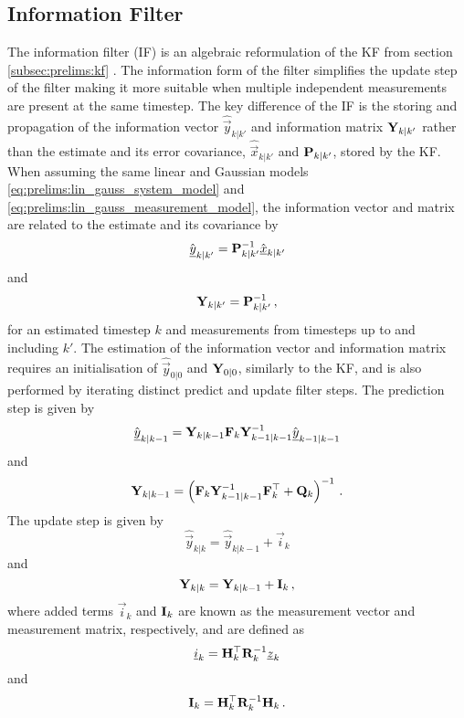 \subsection{Information Filter}\label{subsec:prelims:if}
The information filter (IF) is an algebraic reformulation of the KF from section \ref{subsec:prelims:kf} \cite{simonOptimalStateEstimation2006,mutambaraDecentralizedEstimationControl1998}. The information form of the filter simplifies the update step of the filter making it more suitable when multiple independent measurements are present at the same timestep. The key difference of the IF is the storing and propagation of the information vector $\hat{\vec{y}}_{k|k'}$ and information matrix ${{\mathbf{Y}}}_{k|k'}$ rather than the estimate and its error covariance, $\hat{\vec{x}}_{k|k'}$ and ${{\mathbf{P}}}_{k|k'}$, stored by the KF. When assuming the same linear and Gaussian models \eqref{eq:prelims:lin_gauss_system_model} and \eqref{eq:prelims:lin_gauss_measurement_model}, the information vector and matrix are related to the estimate and its covariance by
\begin{equation}\label{eq:prelims:info_vec_defn}
    \hat{{\underline{y}}}_{k|k'} = {{\mathbf{P}}}_{k|k'}^{-1}\hat{{\underline{x}}}_{k|k'}
\end{equation}
and
\begin{equation}\label{eq:prelims:info_mat_defn}
    {\ensuremath{{\mathbf{Y}}}}_{k|k'} = {{\mathbf{P}}}_{k|k'}^{-1}\,,
\end{equation}
for an estimated timestep $k$ and measurements from timesteps up to and including $k'$. The estimation of the information vector and information matrix requires an initialisation of $\hat{\vec{y}}_{0|0}$ and ${{\mathbf{Y}}}_{0|0}$, similarly to the KF, and is also performed by iterating distinct predict and update filter steps. The prediction step is given by
\begin{equation}\label{eq:prelims:if_info_vec_predict}
    \hat{{\underline{y}}}_{k|k-1} = {{\mathbf{Y}}}_{k|k-1}{{\mathbf{F}}}_k{{\mathbf{Y}}}_{k-1|k-1}^{-1}\hat{{\underline{y}}}_{k-1|k-1}
\end{equation}
and
\begin{equation}\label{eq:prelims:if_info_mat_predict}
    {\ensuremath{{\mathbf{Y}}}}_{k|k-1} = \left({{\mathbf{F}}}_k{{\mathbf{Y}}}_{k-1|k-1}^{-1}{{\mathbf{F}}}_k^\top + {{\mathbf{Q}}}_k\right)^{-1}\,.
\end{equation}
The update step is given by
\begin{equation}\label{eq:prelims:if_info_vec_update_single}
    \hat{\vec{y}}_{k|k} = \hat{\vec{y}}_{k|k-1} + \vec{i}_k
\end{equation}
and
\begin{equation}\label{eq:prelims:if_info_mat_update_single}
    {\ensuremath{{\mathbf{Y}}}}_{k|k} = {{\mathbf{Y}}}_{k|k-1} + {{\mathbf{I}}}_k\,,
\end{equation}
where added terms $\vec{i}_k$ and ${{\mathbf{I}}}_k$ are known as the measurement vector and measurement matrix, respectively, and are defined as
\begin{equation}
    {\underline{i}}_k = {{\mathbf{H}}}_k^\top{\ensuremath{{\mathbf{R}}}}_k^{-1}{\underline{z}}_k
\end{equation}
and
\begin{equation}
    {\ensuremath{{\mathbf{I}}}}_k = {{\mathbf{H}}}_k^\top{\ensuremath{{\mathbf{R}}}}_k^{-1}{{\mathbf{H}}}_k\,.
\end{equation}

